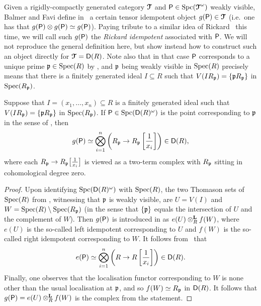 \documentclass[reqno,a4paper]{amsart}
\begin{document}
Given a rigidly-compactly generated category $\operatorname{\boldsymbol{\mathcal{T}}}$ and $\mathsf{P}\in\operatorname{Spc}(\operatorname{\boldsymbol{\mathcal{T}}}^\omega)$ weakly visible, Balmer and Favi define in~\cite[Definition~7.9]{balmerfavi_idempotents} a certain tensor idempotent object $g(\mathsf{P})\in\operatorname{\boldsymbol{\mathcal{T}}}$ (i.e.\ one has that $g(\mathsf{P})\otimes g(\mathsf{P})\simeq g(\mathsf{P})$).
Paying tribute to a similar idea of Rickard~\cite{ric97} this time, we will call such $g(\mathsf{P})$ the \emph{Rickard idempotent} associated with $\mathsf{P}$. We will not reproduce the general definition here, but show instead how to construct such an object directly for $\operatorname{\boldsymbol{\mathcal{T}}}=\mathsf{D}(R)$.
Note also that  in that case $\mathsf{P}$ corresponds to a unique prime $\mathfrak{p}\in\operatorname{Spec}(R)$ by , and $\mathfrak{p}$ being weakly visible in $\operatorname{Spec}(R)$ precisely means that there is a finitely generated ideal $I\subseteq R$ such that $V(IR_{\mathfrak{p}})=\{\mathfrak{p} R_{\mathfrak{p}}\}$ in $\operatorname{Spec}(R_{\mathfrak{p}})$.

\begin{proposition}\label{prop:g(P)-in-D(R)}
Suppose that $I=(x_1,\dots,x_n)\subseteq R$ is a finitely generated ideal such that $V(IR_{\mathfrak{p}})=\{\mathfrak{p} R_{\mathfrak{p}}\}$ in $\operatorname{Spec}(R_{\mathfrak{p}})$. If $\mathsf{P}\in\operatorname{Spc}(\mathsf{D}(R)^\omega)$ is the point corresponding to $\mathfrak{p}$ in the sense of ,
then
\[
g(\mathsf{P}) \simeq \bigotimes_{i=1}^n\left(R_{\mathfrak{p}}\to R_{\mathfrak{p}}\left[\frac{1}{x_i}\right]\right) \in \mathsf{D}(R),
\]
where each $R_{\mathfrak{p}}\to R_{\mathfrak{p}}\big[\frac{1}{x_i}\big]$ is viewed as a two-term complex with $R_{\mathfrak{p}}$ sitting in cohomological degree zero.
\end{proposition}

\begin{proof}
Upon identifying $\operatorname{Spc}(\mathsf{D}(R)^\omega)$ with $\operatorname{Spec}(R)$, the two Thomason sets of $\operatorname{Spec}(R)$ from \cite[Lemma~7.8]{balmerfavi_idempotents}, witnessing that $\mathfrak{p}$ is weakly visible, are $U=V(I)$ and $W=\operatorname{Spec}(R)\setminus\operatorname{Spec}(R_{\mathfrak{p}})$ (in the sense that $\{\mathfrak{p}\}$ equals the intersection of $U$ and the complement of $W$).
Then $g(\mathsf{P})$ is introduced in \cite[Definition~7.9]{balmerfavi_idempotents} as $e(U)\otimes^\mathbf{L}_R f(W)$, where $e(U)$ is the so-called left idempotent corresponding to $U$ and $f(W)$ is the so-called right idempotent corresponding to $W$.
It follows from~\cite[Proposition~6.10]{DG:2002} that 
\[
e(\mathsf{P}) \simeq \bigotimes_{i=1}^n\left(R\to R\left[\frac{1}{x_i}\right]\right) \in \mathsf{D}(R).
\]
Finally, one observes that the localisation functor corresponding to $W$ is none other than the usual localisation at $\mathfrak{p}$, and so $f(W)\simeq R_{\mathfrak{p}}$ in $\mathsf{D}(R)$. It follows that $g(\mathsf{P})=e(U)\otimes^\mathbf{L}_R f(W)$ is the complex from the statement.
\end{proof}
\end{document}
